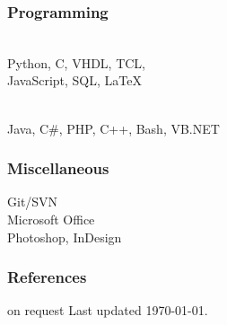 \documentclass[]{resume}
\begin{document}
\begin{facts}
\subsubsection{Programming}
\\
Python, C, VHDL, TCL,\\
JavaScript, SQL, LaTeX
\sectionsep

\\
Java, C\#, PHP, C++, Bash, VB.NET
\sectionsep

\subsubsection{Miscellaneous}
Git/SVN\\
Microsoft Office\\
Photoshop, InDesign
\sectionsep

\subsubsection{References}
on request
\vfill
Last updated \today.

\end{facts}%
\end{document}
